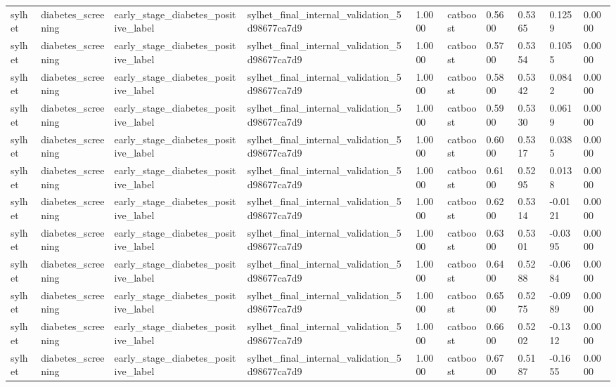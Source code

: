 \begin{tabular}{llllllllll}
sylhet & diabetes\_screening & early\_stage\_diabetes\_positive\_label & sylhet\_final\_internal\_validation\_5d98677ca7d9 & 1.0000 & catboost & 0.5600 & 0.5365 & 0.1259 & 0.0000 \\
sylhet & diabetes\_screening & early\_stage\_diabetes\_positive\_label & sylhet\_final\_internal\_validation\_5d98677ca7d9 & 1.0000 & catboost & 0.5700 & 0.5354 & 0.1055 & 0.0000 \\
sylhet & diabetes\_screening & early\_stage\_diabetes\_positive\_label & sylhet\_final\_internal\_validation\_5d98677ca7d9 & 1.0000 & catboost & 0.5800 & 0.5342 & 0.0842 & 0.0000 \\
sylhet & diabetes\_screening & early\_stage\_diabetes\_positive\_label & sylhet\_final\_internal\_validation\_5d98677ca7d9 & 1.0000 & catboost & 0.5900 & 0.5330 & 0.0619 & 0.0000 \\
sylhet & diabetes\_screening & early\_stage\_diabetes\_positive\_label & sylhet\_final\_internal\_validation\_5d98677ca7d9 & 1.0000 & catboost & 0.6000 & 0.5317 & 0.0385 & 0.0000 \\
sylhet & diabetes\_screening & early\_stage\_diabetes\_positive\_label & sylhet\_final\_internal\_validation\_5d98677ca7d9 & 1.0000 & catboost & 0.6100 & 0.5295 & 0.0138 & 0.0000 \\
sylhet & diabetes\_screening & early\_stage\_diabetes\_positive\_label & sylhet\_final\_internal\_validation\_5d98677ca7d9 & 1.0000 & catboost & 0.6200 & 0.5314 & -0.0121 & 0.0000 \\
sylhet & diabetes\_screening & early\_stage\_diabetes\_positive\_label & sylhet\_final\_internal\_validation\_5d98677ca7d9 & 1.0000 & catboost & 0.6300 & 0.5301 & -0.0395 & 0.0000 \\
sylhet & diabetes\_screening & early\_stage\_diabetes\_positive\_label & sylhet\_final\_internal\_validation\_5d98677ca7d9 & 1.0000 & catboost & 0.6400 & 0.5288 & -0.0684 & 0.0000 \\
sylhet & diabetes\_screening & early\_stage\_diabetes\_positive\_label & sylhet\_final\_internal\_validation\_5d98677ca7d9 & 1.0000 & catboost & 0.6500 & 0.5275 & -0.0989 & 0.0000 \\
sylhet & diabetes\_screening & early\_stage\_diabetes\_positive\_label & sylhet\_final\_internal\_validation\_5d98677ca7d9 & 1.0000 & catboost & 0.6600 & 0.5202 & -0.1312 & 0.0000 \\
sylhet & diabetes\_screening & early\_stage\_diabetes\_positive\_label & sylhet\_final\_internal\_validation\_5d98677ca7d9 & 1.0000 & catboost & 0.6700 & 0.5187 & -0.1655 & 0.0000 \\

\end{tabular}
